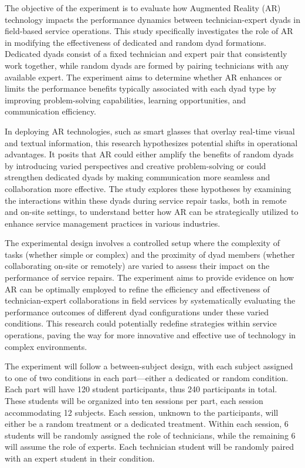 \documentclass[A4,11pt]{article}
\begin{document}
The objective of the experiment is to evaluate how Augmented Reality (AR) technology impacts the performance dynamics between technician-expert dyads in field-based service operations. This study specifically investigates the role of AR in modifying the effectiveness of dedicated and random dyad formations. Dedicated dyads consist of a fixed technician and expert pair that consistently work together, while random dyads are formed by pairing technicians with any available expert. The experiment aims to determine whether AR enhances or limits the performance benefits typically associated with each dyad type by improving problem-solving capabilities, learning opportunities, and communication efficiency.

In deploying AR technologies, such as smart glasses that overlay real-time visual and textual information, this research hypothesizes potential shifts in operational advantages. It posits that AR could either amplify the benefits of random dyads by introducing varied perspectives and creative problem-solving or could strengthen dedicated dyads by making communication more seamless and collaboration more effective. The study explores these hypotheses by examining the interactions within these dyads during service repair tasks, both in remote and on-site settings, to understand better how AR can be strategically utilized to enhance service management practices in various industries.

The experimental design involves a controlled setup where the complexity of tasks (whether simple or complex) and the proximity of dyad members (whether collaborating on-site or remotely) are varied to assess their impact on the performance of service repairs. The experiment aims to provide evidence on how AR can be optimally employed to refine the efficiency and effectiveness of technician-expert collaborations in field services by systematically evaluating the performance outcomes of different dyad configurations under these varied conditions. This research could potentially redefine strategies within service operations, paving the way for more innovative and effective use of technology in complex environments.

The experiment will follow a between-subject design, with each subject assigned to one of two conditions in each part---either a dedicated or random condition. Each part will have 120 student participants, thus 240 participants in total. These students will be organized into ten sessions per part, each session accommodating 12 subjects. Each session, unknown to the participants, will either be a random treatment or a dedicated treatment. Within each session, 6 students will be randomly assigned the role of technicians, while the remaining 6 will assume the role of experts. Each technician student will be randomly paired with an expert student in their condition.
\end{document}
